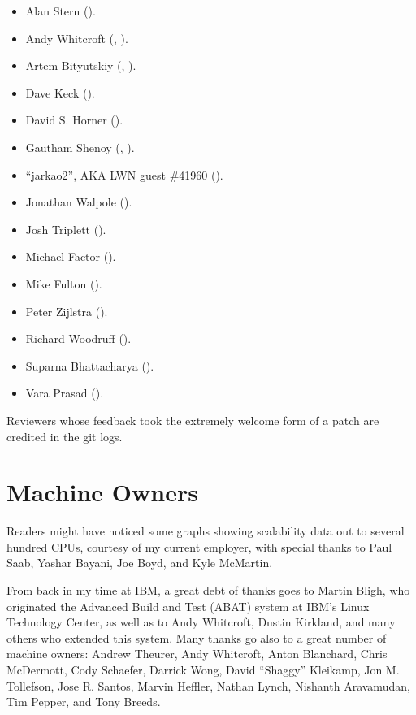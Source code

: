\begin{itemize}
\item	Alan Stern ().
\item	Andy Whitcroft (,
	).
\item	Artem Bityutskiy (,
	).
\item	Dave Keck ().
\item	David S. Horner
	().
\item	Gautham Shenoy (,
	).
\item	``jarkao2'', AKA LWN guest \#41960 ().
\item	Jonathan Walpole ().
\item	Josh Triplett ().
\item	Michael Factor ().
\item	Mike Fulton ().
\item	Peter Zijlstra
	(). %
\item	Richard Woodruff ().
\item	Suparna Bhattacharya ().
\item	Vara Prasad
	().
\end{itemize}

Reviewers whose feedback took the extremely welcome form of a patch
are credited in the git logs.

\section{Machine Owners}

Readers might have noticed some graphs showing scalability data out
to several hundred CPUs, courtesy of my current employer, with special
thanks to Paul Saab, Yashar Bayani, Joe Boyd, and Kyle McMartin.

From back in my time at IBM,
a great debt of thanks goes to Martin Bligh, who originated the
Advanced Build and Test (ABAT) system at IBM's Linux Technology
Center, as well as to Andy Whitcroft, Dustin Kirkland, and many
others who extended this system.
Many thanks go also to a great number of machine owners:
Andrew Theurer,
Andy Whitcroft,
Anton Blanchard,
Chris McDermott,
Cody Schaefer,
Darrick Wong,
David ``Shaggy'' Kleikamp,
Jon M. Tollefson,
Jose R. Santos,
Marvin Heffler,
Nathan Lynch,
Nishanth Aravamudan,
Tim Pepper,
and
Tony Breeds.

